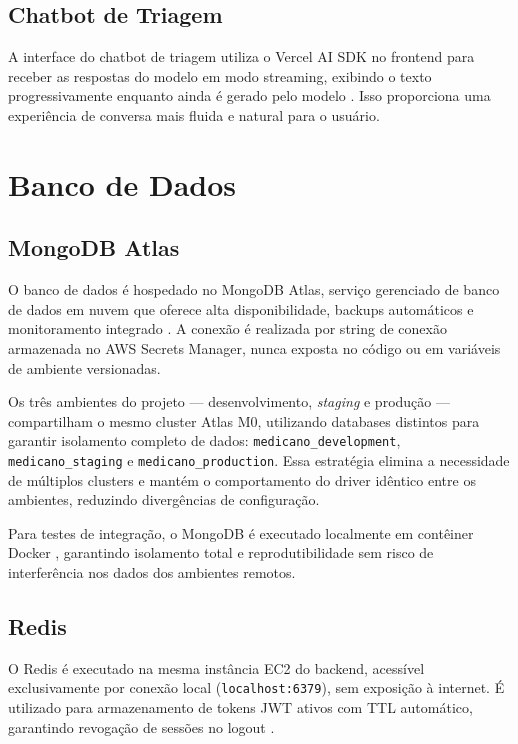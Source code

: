 \subsection{Chatbot de Triagem}
\label{subsec:chat-frontend}

A interface do chatbot de triagem utiliza o Vercel
AI SDK no frontend para receber as respostas do
modelo em modo streaming, exibindo o texto
progressivamente enquanto ainda é gerado pelo
modelo \cite{vercelaisdk2024}. Isso proporciona
uma experiência de conversa mais fluida e natural
para o usuário.

\section{Banco de Dados}
\label{sec:database}

\subsection{MongoDB Atlas}
\label{subsec:mongodb-atlas}

O banco de dados é hospedado no MongoDB Atlas,
serviço gerenciado de banco de dados em nuvem que
oferece alta disponibilidade, backups automáticos
e monitoramento integrado \cite{sadalage2012}.
A conexão é realizada por string de conexão
armazenada no AWS Secrets Manager, nunca exposta
no código ou em variáveis de ambiente versionadas.

Os três ambientes do projeto — desenvolvimento,
\textit{staging} e produção — compartilham o mesmo
cluster Atlas M0, utilizando databases distintos
para garantir isolamento completo de dados:
\texttt{medicano\_development},
\texttt{medicano\_staging} e
\texttt{medicano\_production}. Essa estratégia
elimina a necessidade de múltiplos clusters e
mantém o comportamento do driver idêntico entre
os ambientes, reduzindo divergências de
configuração.

Para testes de integração, o MongoDB é executado
localmente em contêiner Docker \cite{docker2024},
garantindo isolamento total e reprodutibilidade
sem risco de interferência nos dados dos ambientes
remotos.

\subsection{Redis}
\label{subsec:redis-arch}

O Redis é executado na mesma instância EC2 do
backend, acessível exclusivamente por conexão
local (\texttt{localhost:6379}), sem exposição
à internet. É utilizado para armazenamento de
tokens JWT ativos com TTL automático, garantindo
revogação de sessões no logout \cite{redis2024}.

